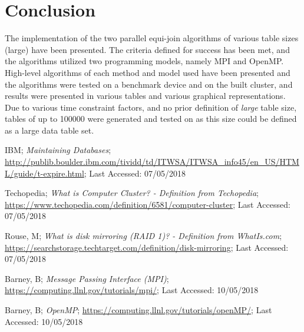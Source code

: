 \documentclass[10pt, conference]{IEEEtran}
\begin{document}
\section{Conclusion}
\label{sec: Conclusion}
The implementation of the two parallel equi-join algorithms of various table sizes (large) have been presented. The criteria defined for success has been met, and the algorithms utilized two programming models, namely MPI and OpenMP. High-level algorithms of each method and model used have been presented and the algorithms were tested on a benchmark device and on the built cluster, and results were presented in various tables and various graphical representations. Due to various time constraint factors, and no prior definition of \emph{large} table size, tables of up to 100000 were generated and tested on as this size could be defined as a large data table set.

\begin{thebibliography}{}

IBM; \emph{Maintaining Databases}; \url{http://publib.boulder.ibm.com/tividd/td/ITWSA/ITWSA_info45/en_US/HTML/guide/t-expire.html}; Last Accessed: 07/05/2018


Techopedia; \emph{What is Computer Cluster? - Definition from Techopedia}; \url{https://www.techopedia.com/definition/6581/computer-cluster}; Last Accessed: 07/05/2018

Rouse, M; \emph{What is disk mirroring (RAID 1)? - Definition from WhatIs.com}; \url{https://searchstorage.techtarget.com/definition/disk-mirroring}; Last Accessed: 07/05/2018

Barney, B; \emph{Message Passing Interface (MPI)}; \url{https://computing.llnl.gov/tutorials/mpi/}; Last Accessed: 10/05/2018


Barney, B; \emph{OpenMP}; \url{https://computing.llnl.gov/tutorials/openMP/}; Last Accessed: 10/05/2018



\end{thebibliography}




\end{document}
